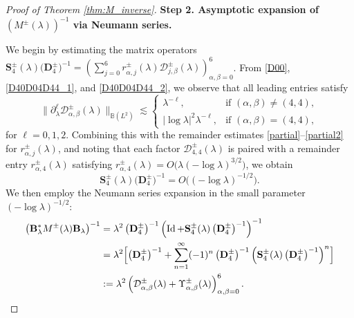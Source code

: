 \documentclass[reqno]{amsart}
\def\Id{\mathop{\mathrm{Id}}\nolimits}
\numberwithin{equation}{section}
\begin{document}
\begin{proof}[Proof of Theorem \ref{thm:M_inverse}]
	
    {\textbf{Step 2. Asymptotic expansion of $(M^{\pm}(\lambda))^{-1}$ via Neumann series.}}
    
We begin by estimating the matrix operators $\mathbf{S}_{4}^{\pm}(\lambda)\bigl(\mathbf{D}_{4}^{\pm}\bigr)^{-1}=\left(\sum_{j=0}^6 r_{\alpha,j}^\pm(\lambda)\mathcal{D}_{j,\beta}^{\pm}(\lambda)\right)_{\alpha,\beta=0}^{6}$. From \eqref{D00}, \eqref{D40D04D44_1}, and \eqref{D40D04D44_2}, we observe that all leading entries satisfy 
\[
\Big\| \partial_\lambda^\ell \mathcal{D}_{\alpha,\beta}^{\pm}(\lambda) \Big\|_{\mathbb{B}(L^2)} \lesssim
\begin{cases}
\lambda^{-\ell}, & \text{if } (\alpha, \beta) \neq (4,4), \\[4pt]
|\log \lambda|^2 \lambda^{-\ell}, & \text{if } (\alpha, \beta) = (4,4),
\end{cases}
\]
for $\ell = 0,1,2$. Combining this with the remainder estimates \eqref{partial}--\eqref{partial2} for $r_{\alpha,j}^\pm(\lambda)$, and noting that each factor $\mathcal{D}_{4,4}^{\pm}(\lambda)$ is paired with a remainder entry $r_{\alpha,4}^\pm(\lambda)$ satisfying $r_{\alpha,4}^\pm(\lambda) = O\bigl(\lambda (-\log \lambda)^{3/2}\bigr)$, we obtain
\[
\mathbf{S}_{4}^{\pm}(\lambda)\bigl(\mathbf{D}_{4}^{\pm}\bigr)^{-1} = O\bigl((-\log \lambda)^{-1/2}\bigr).
\]
We then employ the Neumann series expansion in the small parameter $(-\log \lambda)^{-1/2}$:
\begin{align}
\left(\mathbf{B}_\lambda^* M^{\pm}(\lambda) \mathbf{B}_\lambda\right)^{-1}
&=\lambda^2 \left(\mathbf{D}_{4}^{\pm}\right)^{-1}\left(\Id +\mathbf{S}_{4}^{\pm}(\lambda)\left(\mathbf{D}_{4}^{\pm}\right)^{-1}\right)^{-1} \nonumber\\
&= \lambda^2 \Bigl[ \left(\mathbf{D}_{4}^{\pm}\right)^{-1} + \sum_{n=1}^{\infty}(-1)^n \left(\mathbf{D}_{4}^{\pm}\right)^{-1} \left( \mathbf{S}_{4}^{\pm}(\lambda) \left(\mathbf{D}_{4}^{\pm}\right)^{-1} \right)^n \Bigr] \nonumber\\
&:= \lambda^2 \left( \mathcal{D}_{\alpha,\beta}^\pm(\lambda) + \Upsilon_{\alpha,\beta}^\pm(\lambda) \right)_{\alpha,\beta=0}^{6}. \label{MM-inver}
\end{align}


\end{proof}
\end{document}
